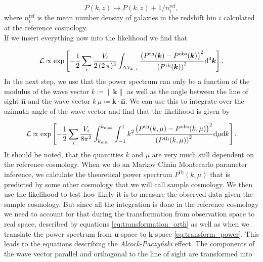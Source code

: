 \documentclass[../main.tex]{subfiles}
\begin{document}
\begin{equation}
    P(k,z) \to P(k,z) + 1/n_i^\mathrm{ref},
\end{equation}  
where $n_i^\mathrm{ref}$ is the mean number density of galaxies in the redshift bin $i$ calculated at the reference cosmology.\\
 If we insert everything now into the likelihood we find that 
 
 \begin{equation}
    \mathcal{L} \propto \exp\left[-\frac{1}{2} \sum_i \frac{V_i}{2\,(2\,\pi)^3} \int_{\Delta V_{\boldsymbol{k}\,,i}} \frac{\left(P^\mathrm{th}(\boldsymbol{k})-P^\mathrm{obs}(\boldsymbol{k})\right)^2}{\left(P^\mathrm{th}(\boldsymbol{k})\right)^2} \mathrm{d}^3 \boldsymbol{k} \right].
 \end{equation}
 In the next step, we use that the power spectrum can only be a function of the modulus of the wave vector $k \coloneqq \|\boldsymbol{k}\|$ as well as the angle between the line of sight $\hat{\boldsymbol{n}}$ and the wave vector $k \,\mu \coloneqq \boldsymbol{k} \cdot \hat{\boldsymbol{n}}$. We can use this to integrate over the azimuth angle of the wave vector and find that the likelihood is given by
 
 \begin{equation}
    \mathcal{L} \propto \exp\left[-\frac{1}{2} \sum_i \frac{V_i}{8 \pi^2} \int_{k_\mathrm{min}}^{k_\mathrm{max}} \int_{-1}^{1} k^2 \frac{\left(P^\mathrm{th}(k,\mu)-P^\mathrm{obs}(k,\mu)\right)^2}{\left(P^\mathrm{th}(k,\mu)\right)^2} \mathrm{d} \mu \mathrm{d} k \right]. 
 \end{equation}
 It should be noted, that the quantities $k$ and $\mu$ are very much still dependent on the reference cosmology. When we do an Markov Chain Montecarlo parameter inference, we calculate the theoretical power spectrum $P^\mathrm{th}(k,\mu)$ that is predicted by some other cosmology that we will call sample cosmology. We then use the likelihood to test how likely it is to measure the observed data given the sample cosmology. But since all the integration is done in the reference cosmology we need to account for that during the transformation from observation space to real space, described by equations \ref{eq:transformation_orth} as well as when we translate the power spectrum from $\boldsymbol{u}$-space to $\boldsymbol{k}$-space \ref{eq:transform_power}. This leads to the equations describing the \textit{Alcock-Paczyński} effect. The components of the wave vector parallel and orthogonal to the line of sight are transformed into
 
\end{document}
